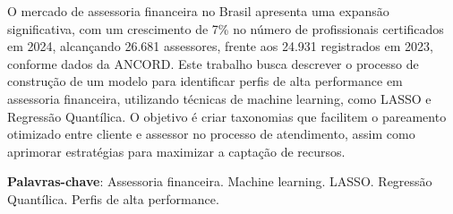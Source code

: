 \documentclass[12pt, openright, oneside, a4paper, chapter=TITLE, english, brazil]{abntex2}
\begin{document}
\imprimircapa
\imprimirfolhaderosto

\begin{resumo}
O mercado de assessoria financeira no Brasil apresenta uma expansão
significativa, com um crescimento de 7\% no número de profissionais
certificados em 2024, alcançando 26.681 assessores, frente aos 24.931
registrados em 2023, conforme dados da ANCORD. Este trabalho busca descrever 
o processo de construção de um modelo para identificar perfis de alta 
performance em assessoria financeira, utilizando técnicas de machine learning, 
como LASSO e Regressão Quantílica. O objetivo é criar taxonomias que facilitem 
o pareamento otimizado entre cliente e assessor no processo de atendimento, 
assim como aprimorar estratégias para maximizar a captação de recursos.

\vspace{\onelineskip}
\noindent
\textbf{Palavras-chave}: Assessoria financeira. Machine learning. LASSO. Regressão Quantílica. Perfis de alta performance.
\end{resumo}

\tableofcontents
\cleardoublepage

\textual







\postextual

\end{document}
